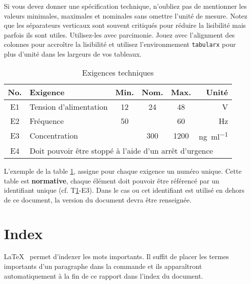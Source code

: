 Si vous devez donner une spécification technique, n'oubliez pas de mentionner les valeurs minimales, maximales et nominales sans omettre l'unité de mesure. Notez que les séparateurs verticaux sont souvent critiqués pour réduire la lisibilité mais parfois ils sont utiles. Utilisez-les avec parcimonie. Jouez avec l'alignment des colonnes pour accroître la lisibilité et utilisez l'environmement \texttt{tabularx} pour plus d'unité dans les largeurs de vos tableaux.

\begin{table}[h]
    \begin{center}
        \caption{Exigences techniques \label{specification}}
        \begin{tabularx}{\textwidth}{cXcccr}
            \toprule
            No. & Exigence                                                                   & Min. & Nom. & Max. & Unité                           \\
            \midrule
            E1  & Tension d'alimentation                                                     & 12   & 24   & 48   & \si{\volt}                      \\
            E2  & Fréquence                                                                  & 50   &      & 60   & \si{\hertz}                     \\
            E3  & Concentration                                                              &      & 300  & 1200 & \si{\nano\gram\per\milli\litre} \\
            E4  & \multicolumn{5}{l}{Doit pouvoir être stoppé à l'aide d'un arrêt d'urgence}                                                        \\
            \bottomrule
        \end{tabularx}
    \end{center}
\end{table}

L'exemple de la table \ref{specification}, assigne pour chaque exigence un numéro unique. Cette table est \textbf{normative}, chaque élément doit pouvoir être référencé par un identifiant unique (cf. T\ref{specification}-E3). Dans le cas ou cet identifiant est utilisé en dehors de ce document, la version du document devra être renseignée.

\section{Index}
\LaTeX~ permet d'indexer les mots  importants. Il suffit de placer les termes importants d'un paragraphe dans la commande \texttt{} et ils apparaîtront automatiquement à la fin de ce rapport dans l'index du document.


